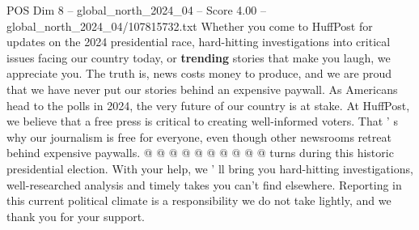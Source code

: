 \begin{textsample}{POS Dim 8 – global\_north\_2024\_04 – Score 4.00 – global\_north\_2024\_04/107815732.txt}
Whether you come to HuffPost for updates on the 2024 presidential race, hard-hitting investigations into critical issues facing our country today, or \textbf{trending} stories that make you laugh, we appreciate you.
The truth is, news costs money to produce, and we are proud that we have never put our stories behind an expensive paywall.
As Americans head to the polls in 2024, the very future of our country is at stake.
At HuffPost, we believe that a free press is critical to creating well-informed voters.
That ' s why our journalism is free for everyone, even though other newsrooms retreat behind expensive paywalls. @ @ @ @ @ @ @ @ @ @ turns during this historic presidential election.
With your help, we ' ll bring you hard-hitting investigations, well-researched analysis and timely takes you can't find elsewhere.
Reporting in this current political climate is a responsibility we do not take lightly, and we thank you for your support.

\end{textsample}

